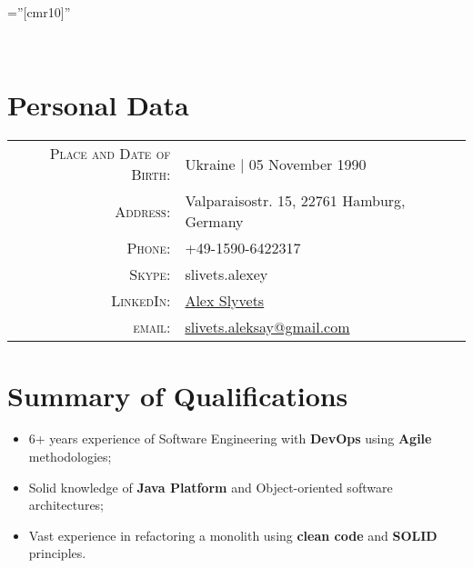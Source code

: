 \documentclass[a4paper,10pt]{article} %
\begin{document}
\pagestyle{empty} %

\font\fb=''[cmr10]'' %



\\ %


\section{Personal Data}

\begin{tabular}{rl}
\textsc{Place and Date of Birth:} & Ukraine  | 05 November 1990 \\
\textsc{Address:} & Valparaisostr. 15, 22761 Hamburg, Germany \\
\textsc{Phone:} & +49-1590-6422317\\
\textsc{Skype:} & slivets.alexey \\
\textsc{LinkedIn:} & \href{https://www.linkedin.com/in/oslyvets/}{Alex Slyvets} \\
\textsc{email:} & \href{mailto:slivets.aleksay@gmail.com}{slivets.aleksay@gmail.com} \\
\end{tabular}



\section{Summary of Qualifications}
\begin{itemize}

\setlength\itemsep{-0.40em}
\item 6+ years experience of Software Engineering with \textbf{DevOps} using  \textbf{Agile} methodologies;
\item Solid knowledge of \textbf{Java Platform} and Object-oriented software architectures;
\item Vast experience in refactoring a monolith using \textbf{clean code} and \textbf{SOLID} principles.

\end{itemize}
\end{document}
